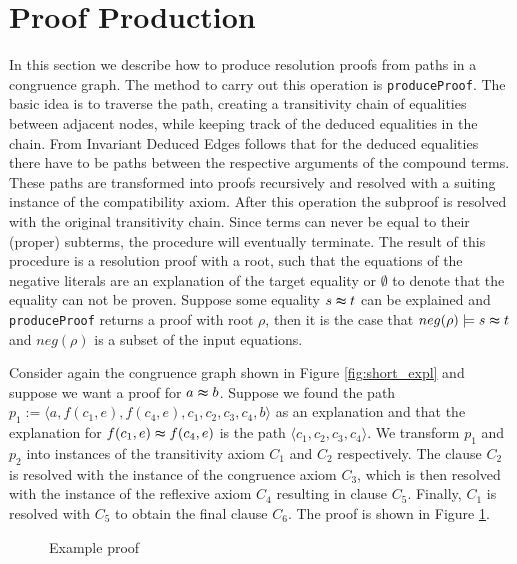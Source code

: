 \section{Proof Production}
\label{sec:proofproduction}

In this section we describe how to produce resolution proofs from paths in a congruence graph.
The method to carry out this operation is \texttt{produceProof}.
The basic idea is to traverse the path, creating a transitivity chain of equalities between adjacent nodes, while keeping track of the deduced equalities in the chain.
From Invariant Deduced Edges follows that for the deduced equalities there have to be paths between the respective arguments of the compound terms.
These paths are transformed into proofs recursively and resolved with a suiting instance of the compatibility axiom.
After this operation the subproof is resolved with the original transitivity chain.
Since terms can never be equal to their (proper) subterms, the procedure will eventually terminate.
The result of this procedure is a resolution proof with a root, such that the equations of the negative literals are an explanation of the target equality or $\emptyset$ to denote that the equality can not be proven.
Suppose some equality $s \thickapprox t$ can be explained and \texttt{produceProof} returns a proof with root $\rho$, then it is the case that $neg(\rho) \models s \thickapprox t$ and $neg(\rho)$ is a subset of the input equations.




\begin{example}

Consider again the congruence graph shown in Figure \ref{fig:short_expl} and suppose we want a proof for $a \thickapprox b$.
Suppose we found the path $p_1 := \langle  a, f(c_1,e), f(c_4,e), c_1, c_2, c_3, c_4, b \rangle$ as an explanation and that the explanation for $f(c_1,e) \thickapprox f(c_4,e)$ is the path $\langle c_1, c_2, c_3, c_4 \rangle$.
We transform $p_1$ and $p_2$ into instances of the transitivity axiom $C_1$ and $C_2$ respectively. 
The clause $C_2$ is resolved with the instance of the congruence axiom $C_3$, which is then resolved with the instance of the reflexive axiom $C_4$ resulting in clause $C_5$.
Finally, $C_1$ is resolved with $C_5$ to obtain the final clause $C_6$.
The proof is shown in Figure \ref{fig:proofprod}.

\begin{figure}[!h]

\caption{Example proof}
\label{fig:proofprod}
\end{figure}

\end{example}

